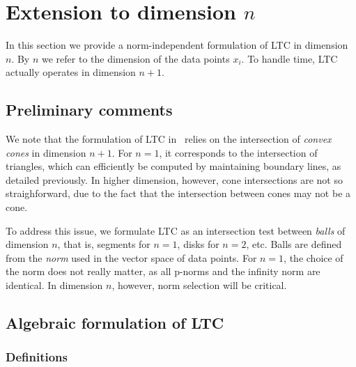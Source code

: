 \documentclass[10pt, conference, compsocconf]{IEEEtran}
\newcommand{\todo}[1]{\marginpar{\parbox{18mm}{\flushleft\tiny\color{red}\textbf{TODO}:
      #1}}}
\begin{document}


\section{Extension to dimension $n$}
\label{sec:extension}
In this section we provide a norm-independent formulation of LTC in
dimension $n$. By $n$ we refer to the dimension of the data points
$x_i$. To handle time, LTC actually operates in dimension
$n+1$.

\subsection{Preliminary comments}

We note that the formulation of LTC in~\cite{schoellhammer2004lightweight} relies on
the intersection of \emph{convex cones} in dimension $n+1$. For $n=1$, it
corresponds to the intersection of triangles, which can efficiently be
computed by maintaining boundary lines, as detailed previously. In higher dimension, however, cone intersections are not so
straighforward, due to the fact that the intersection between cones
may not be a cone.

To address this issue, we formulate LTC as an intersection test between
\emph{balls} of dimension $n$, that is, segments for $n=1$, disks for
$n=2$, etc. Balls are defined from the \emph{norm} used in
the vector space of data points. For $n=1$, the choice of the norm does
not really matter, as all p-norms and the infinity norm are identical.
In dimension $n$, however, norm selection will be critical.

\subsection{Algebraic formulation of LTC}

\subsubsection{Definitions}
\end{document}
